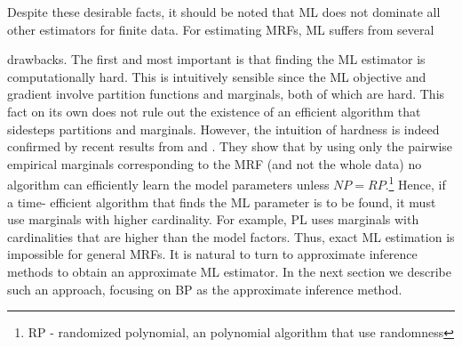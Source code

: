 Despite these desirable facts, it should be noted that ML does not dominate all other estimators for finite data.
For estimating MRFs, ML suffers from several  drawbacks. The first and most important is that finding the ML estimator is computationally hard. This is intuitively sensible since the ML objective and gradient involve partition functions and marginals, both of which are hard. This fact on its own does not rule out the existence of an efficient algorithm that sidesteps partitions and marginals.
However, the intuition of hardness is indeed confirmed by recent results from \cite{bresler2014hardness} and \cite{montanari2015computational}.
They show that by using only the pairwise empirical marginals corresponding to the MRF (and not the whole data) no algorithm can efficiently learn the model parameters unless  $NP = RP$.\footnote{RP - randomized polynomial, an polynomial algorithm that use randomness}
Hence, if a time- efficient algorithm that finds the ML parameter is to be found, it must use marginals with higher cardinality.
For example, PL uses marginals with cardinalities that are higher than the model factors.
Thus, exact ML estimation is impossible for general MRFs.
It is natural to turn to approximate inference methods to obtain an approximate ML estimator.
In the next section we describe such an approach, focusing on BP as the approximate inference method.

